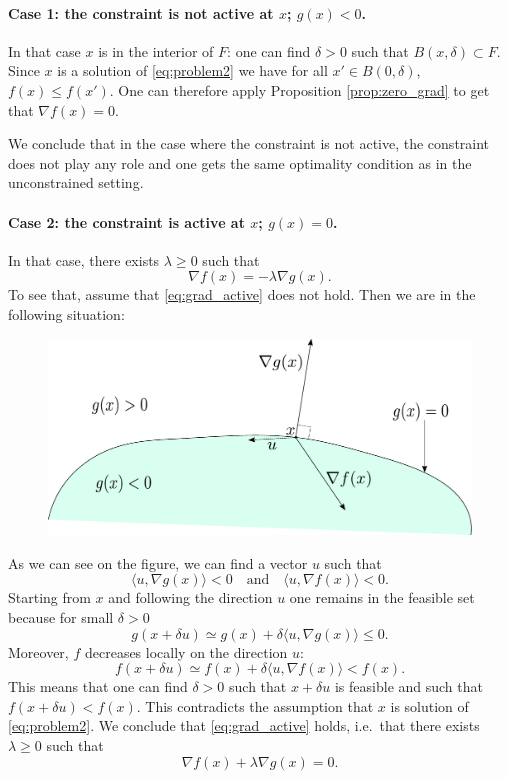 \documentclass[11pt,nocut]{article}
\begin{document}
\paragraph{Case 1: the constraint is not active at $x$; $g(x) <0$.} In that case $x$ is in the interior of $F$: one can find $\delta > 0$ such that $B(x,\delta) \subset F$. Since $x$ is a solution of \eqref{eq:problem2} we have for all $x' \in B(0,\delta)$, $f(x) \leq f(x')$. One can therefore apply Proposition \ref{prop:zero_grad} to get that $\nabla f(x) = 0$.

We conclude that in the case where the constraint is not active, the constraint does not play any role and one gets the same optimality condition as in the unconstrained setting.

\paragraph{Case 2: the constraint is active at $x$; $g(x) = 0$.}
In that case, there exists $\lambda \geq 0$ such that 
\begin{equation}\label{eq:grad_active}
	\nabla f(x) = - \lambda \nabla g(x).
\end{equation}
To see that, assume that \eqref{eq:grad_active} does not hold. Then we are in the following situation:
\begin{figure}[h!]
	\begin{center}
		\includegraphics[width=0.8\linewidth]{figures/absurd.pdf}
	\end{center}
\end{figure}

As we can see on the figure, we can find a vector $u$ such that
$$
\langle u, \nabla g(x) \rangle < 0 
\quad \text{and} \quad
\langle u, \nabla f(x) \rangle < 0.
$$
Starting from $x$ and following the direction $u$ one remains in the feasible set because for small $\delta >0$
$$
g(x + \delta u) \simeq g(x) + \delta \langle u, \nabla g(x) \rangle \leq 0.
$$
Moreover, $f$ decreases locally on the direction $u$:
$$
f(x + \delta u) \simeq f(x) + \delta \langle u, \nabla f(x) \rangle < f(x).
$$
This means that one can find $\delta > 0$ such that $x + \delta u$ is feasible and such that $f(x + \delta u) < f(x)$. This contradicts the assumption that $x$ is solution of \eqref{eq:problem2}.
We conclude that \eqref{eq:grad_active} holds, i.e.\ that there exists $\lambda \geq 0$ such that
$$
\nabla f(x) + \lambda \nabla g(x) = 0.
$$
\end{document}

